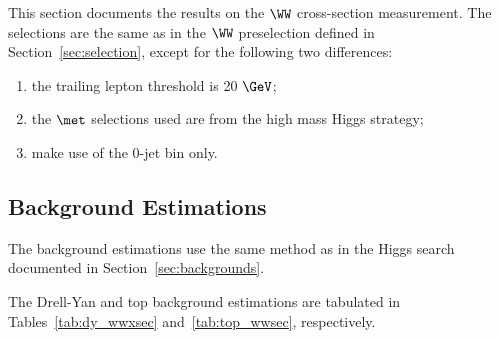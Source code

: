 This section documents the results on the $\WW$ cross-section measurement. 
The selections are the same as in the $\WW$ preselection defined in 
Section~\ref{sec:selection}, except for the following two differences:

\begin{enumerate}
\item the trailing lepton threshold is 20 $\GeV$;
\item the $\met$ selections used are from the high mass Higgs strategy;
\item make use of the 0-jet bin only.
\end{enumerate}


\subsection{Background Estimations}

The background estimations use the same method as in the Higgs search 
documented in Section~\ref{sec:backgrounds}.

The Drell-Yan and top background estimations are tabulated in 
Tables~\ref{tab:dy_wwxsec} and~\ref{tab:top_wwsec}, respectively.

